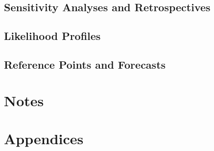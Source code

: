 \documentclass[
]{scrartcl}
\begin{document}
\newpage

\subsection{Sensitivity Analyses and
Retrospectives}\label{sensitivity-analyses-and-retrospectives}

\newpage

\subsection{Likelihood Profiles}\label{likelihood-profiles-1}

\newpage

\subsection{Reference Points and
Forecasts}\label{reference-points-and-forecasts}

\newpage

\newpage{}

\section{Notes}\label{notes}

\newpage{}

\section{Appendices}\label{sec-appendix}
\end{document}
